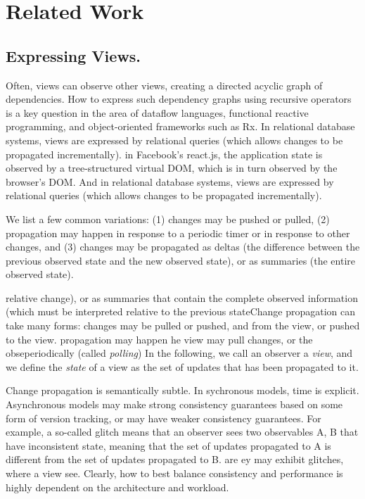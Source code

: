 \section{Related Work}

\subsection{Expressing Views.} Often, views can observe other views, creating a directed acyclic graph of dependencies. How to express such dependency graphs using recursive operators is a key question in the area of dataflow languages, functional reactive programming, and object-oriented frameworks such as Rx. In relational database systems, views are expressed by relational queries (which allows changes to be propagated incrementally). in Facebook's react.js, the application state is observed by a tree-structured virtual DOM, which is in turn observed by the browser's DOM. And in relational database systems, views are expressed by relational queries (which allows changes to be propagated incrementally). 

We list a few common variations: (1) changes may be pushed or pulled, (2) propagation may happen in response to a periodic timer or in response to other changes, and (3) changes may be propagated as deltas (the difference between the previous observed state and the new observed state), or as summaries (the entire observed state).

  relative change), or as summaries that contain the complete observed information  (which must be interpreted relative to the previous stateChange propagation can take many forms: changes may be pulled or pushed, and from the view, or pushed to the view. propagation may happen he view may pull changes, or the obseperiodically (called \emph{polling}) In the following, we call an observer a \emph{view}, and we define the \emph{state} of a view as the set of updates that has been propagated to it. 




Change propagation is semantically subtle. In sychronous models, time is explicit. Asynchronous models may make strong consistency guarantees based on some form of version tracking, or may have weaker consistency guarantees. For example, a so-called glitch means that an observer sees two observables A, B that have inconsistent state, meaning that the set of updates propagated to A is different from the set of updates propagated to B. are ey may exhibit glitches, where a view see. Clearly, how to best balance consistency and performance is highly dependent on the architecture and workload. 

